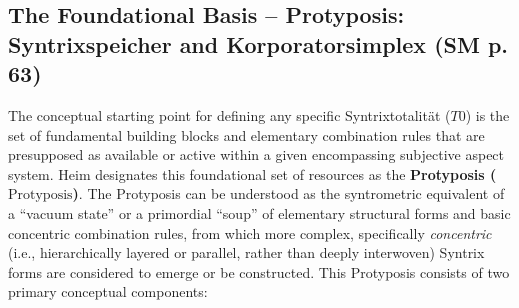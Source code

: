 \documentclass[
    12pt,              %
    a4paper,           %
    headings=normal,   %
    twoside=true,      %
    BCOR=8mm,          %
]{scrbook}
\newcommand{\q}[1]{\enquote{#1}}
\newcommand{\syntrixtotalitaet}{T0}
\newcommand{\protyposis}{\text{Protyposis}}
\begin{document}
\subsection{The Foundational Basis – Protyposis: Syntrixspeicher and Korporatorsimplex (SM p. 63)}
\label{sec:ch4_protyposis_revised} 

The conceptual starting point for defining any specific Syntrixtotalität (\(\syntrixtotalitaet\)) is the set of fundamental building blocks and elementary combination rules that are presupposed as available or active within a given encompassing subjective aspect system. Heim designates this foundational set of resources as the \textbf{Protyposis (\(\protyposis\))}. The Protyposis can be understood as the syntrometric equivalent of a \q{vacuum state} or a primordial \q{soup} of elementary structural forms and basic concentric combination rules, from which more complex, specifically \textit{concentric} (i.e., hierarchically layered or parallel, rather than deeply interwoven) Syntrix forms are considered to emerge or be constructed. This Protyposis consists of two primary conceptual components:
\end{document}
